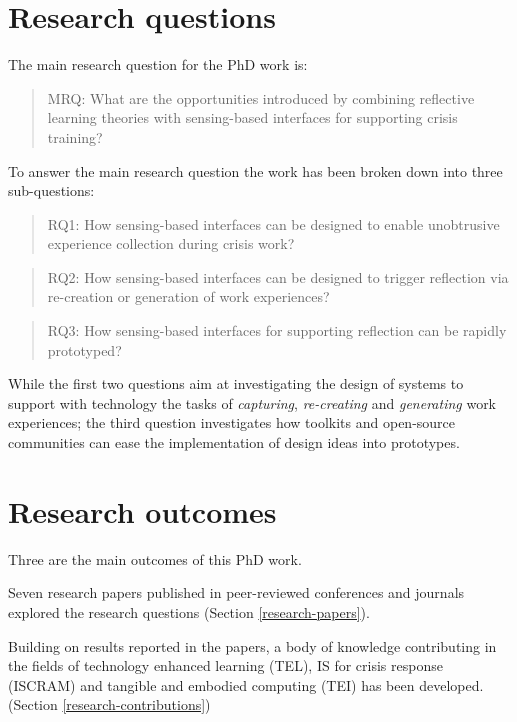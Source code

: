 \section{Research questions}\label{research-questions}

The main research question for the PhD work is:

\begin{quote}
MRQ: What are the opportunities introduced by combining reflective
learning theories with sensing-based interfaces for supporting crisis
training?
\end{quote}

To answer the main research question the work has been broken down into
three sub-questions:

\begin{quote}
RQ1: How sensing-based interfaces can be designed to enable unobtrusive
experience collection during crisis work?
\end{quote}

\begin{quote}
RQ2: How sensing-based interfaces can be designed to trigger reflection
via re-creation or generation of work experiences?
\end{quote}

\begin{quote}
RQ3: How sensing-based interfaces for supporting reflection can be
rapidly prototyped?
\end{quote}

While the first two questions aim at investigating the design of systems
to support with technology the tasks of \emph{capturing},
\emph{re-creating} and \emph{generating} work experiences; the third
question investigates how toolkits and open-source communities can ease
the implementation of design ideas into prototypes.

\section{Research outcomes}\label{research-outcomes}

Three are the main outcomes of this PhD work.

Seven research papers published in peer-reviewed conferences and
journals explored the research questions (Section
\ref{research-papers}).

Building on results reported in the papers, a body of knowledge
contributing in the fields of technology enhanced learning (TEL), IS for
crisis response (ISCRAM) and tangible and embodied computing (TEI) has
been developed. (Section \ref{research-contributions})

